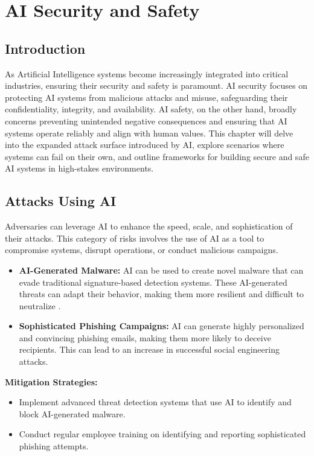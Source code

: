 \chapter{AI Security and Safety}
\label{chap:ai_security_and_safety}

\section{Introduction}
\label{sec:security_introduction}
As Artificial Intelligence systems become increasingly integrated into critical industries, ensuring their security and safety is paramount. AI security focuses on protecting AI systems from malicious attacks and misuse, safeguarding their confidentiality, integrity, and availability. AI safety, on the other hand, broadly concerns preventing unintended negative consequences and ensuring that AI systems operate reliably and align with human values. This chapter will delve into the expanded attack surface introduced by AI, explore scenarios where systems can fail on their own, and outline frameworks for building secure and safe AI systems in high-stakes environments.

\section{Attacks Using AI}
\label{sec:attacks_using_ai}

Adversaries can leverage AI to enhance the speed, scale, and sophistication of their attacks. This category of risks involves the use of AI as a tool to compromise systems, disrupt operations, or conduct malicious campaigns.

\begin{itemize}
    \item \textbf{AI-Generated Malware:} AI can be used to create novel malware that can evade traditional signature-based detection systems. These AI-generated threats can adapt their behavior, making them more resilient and difficult to neutralize \parencite{DHS2024AIRisks}.
    \item \textbf{Sophisticated Phishing Campaigns:} AI can generate highly personalized and convincing phishing emails, making them more likely to deceive recipients. This can lead to an increase in successful social engineering attacks.
\end{itemize}

\begin{tipbox}
    \textbf{Mitigation Strategies:}
    \begin{itemize}
        \item Implement advanced threat detection systems that use AI to identify and block AI-generated malware.
        \item Conduct regular employee training on identifying and reporting sophisticated phishing attempts.
    \end{itemize}
\end{tipbox}

